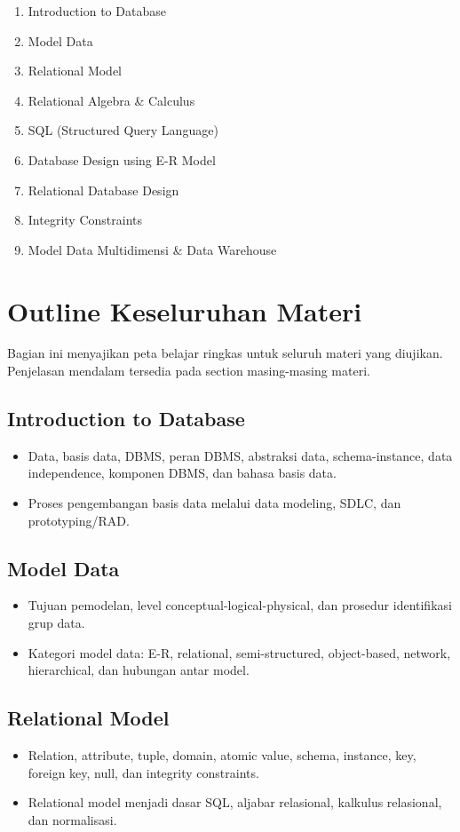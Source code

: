 \documentclass[11pt,a4paper]{article}
\begin{document}
\begin{enumerate}
    \item Introduction to Database
    \item Model Data
    \item Relational Model
    \item Relational Algebra \& Calculus
    \item SQL (Structured Query Language)
    \item Database Design using E-R Model
    \item Relational Database Design
    \item Integrity Constraints
    \item Model Data Multidimensi \& Data Warehouse
\end{enumerate}

\section{Outline Keseluruhan Materi}

Bagian ini menyajikan peta belajar ringkas untuk seluruh materi yang diujikan.
Penjelasan mendalam tersedia pada section masing-masing materi.

\subsection{Introduction to Database}
\begin{itemize}
    \item Data, basis data, DBMS, peran DBMS, abstraksi data, schema-instance, data independence, komponen DBMS, dan bahasa basis data.
    \item Proses pengembangan basis data melalui data modeling, SDLC, dan prototyping/RAD.
\end{itemize}

\subsection{Model Data}
\begin{itemize}
    \item Tujuan pemodelan, level conceptual-logical-physical, dan prosedur identifikasi grup data.
    \item Kategori model data: E-R, relational, semi-structured, object-based, network, hierarchical, dan hubungan antar model.
\end{itemize}

\subsection{Relational Model}
\begin{itemize}
    \item Relation, attribute, tuple, domain, atomic value, schema, instance, key, foreign key, null, dan integrity constraints.
    \item Relational model menjadi dasar SQL, aljabar relasional, kalkulus relasional, dan normalisasi.
\end{itemize}
\end{document}
